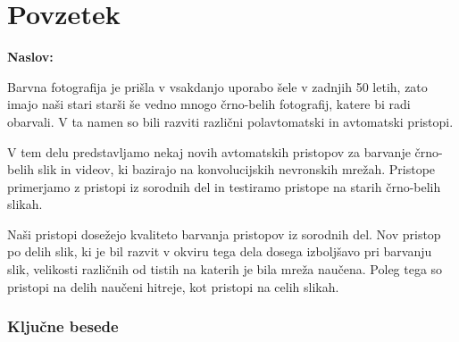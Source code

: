 \chapter*{Povzetek}

\noindent\textbf{Naslov:} \ttitle
\bigskip

Barvna fotografija je prišla v vsakdanjo uporabo šele v zadnjih 50 letih, zato imajo naši stari starši še vedno mnogo črno-belih fotografij, katere bi radi obarvali. V ta namen so bili razviti različni polavtomatski in avtomatski pristopi. 

V tem delu predstavljamo nekaj novih avtomatskih pristopov za barvanje črno-belih slik in videov, ki bazirajo na konvolucijskih nevronskih mrežah. Pristope primerjamo z pristopi iz sorodnih del in testiramo pristope na starih črno-belih slikah. 

Naši pristopi dosežejo kvaliteto barvanja pristopov iz sorodnih del. Nov pristop po delih slik, ki je bil razvit v okviru tega dela dosega izboljšavo pri barvanju slik, velikosti različnih od tistih na katerih je bila mreža naučena. Poleg tega so pristopi na delih naučeni hitreje, kot pristopi na celih slikah. 

\subsection*{Ključne besede}
\textit{\tkeywords}
\clearemptydoublepage
